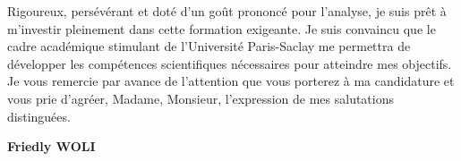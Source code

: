 \documentclass[11pt,a4paper]{article}
\begin{document}
		Rigoureux, persévérant et doté d’un goût prononcé pour l’analyse, je suis prêt à m’investir pleinement dans cette formation exigeante. Je suis convaincu que le cadre académique stimulant de l’Université Paris-Saclay me permettra de développer les compétences scientifiques nécessaires pour atteindre mes objectifs.\\
		
		Je vous remercie par avance de l’attention que vous porterez à ma candidature et vous prie d’agréer, Madame, Monsieur, l’expression de mes salutations distinguées.
		
		
	
	
	\vspace{0.8cm}
	
	
	
	
	
	
	\begin{flushright}
		
		\textbf{Friedly WOLI}
	\end{flushright}
	
	
\end{document}
